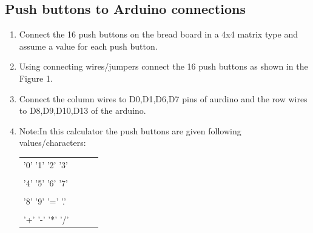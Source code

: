 \documentclass[11pt]{article}
\begin{document}
		\subsection{Push buttons to Arduino connections}
		\begin{enumerate}
			\item Connect the 16 push buttons on the bread board in a 4x4 matrix type and assume a value for each push button.
			\item Using connecting wires/jumpers connect the 16 push buttons as shown in the Figure 1.
			\item Connect the column wires to D0,D1,D6,D7 pins of aurdino and the row wires to D8,D9,D10,D13 of the arduino.
			\item Note:In this calculator the push buttons are given following values/characters:
			\begin{table}[h]
			\centering
			\begin{tabular}{llll}
			'0'   '1'   '2'   '3' \\
			\\
			'4'   '5'   '6'   '7' \\
			\\
			'8'   '9'   '='   '.' \\
			\\
			'+'   '-'   '*'   '/'
			
			\end{tabular}
			\end{table}
			
	\end{enumerate}
\end{document}

